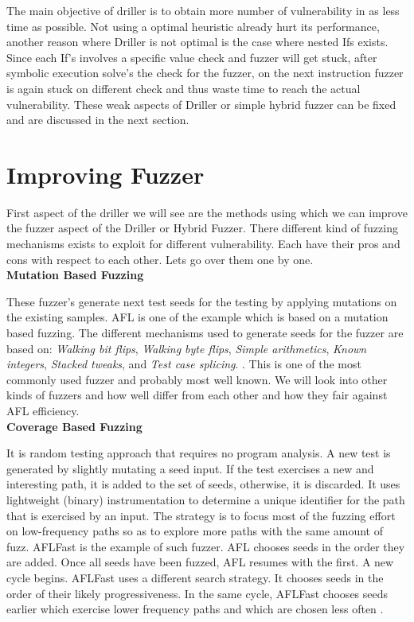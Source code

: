 \documentclass[a4paper, 11pt]{article}
\begin{document}
The main objective of driller is to obtain more number of vulnerability in as less time as possible. Not using a optimal heuristic already hurt its performance, another reason where Driller is not optimal is the case where nested Ifs exists. Since each If's involves a specific value check and fuzzer will get stuck, after symbolic execution solve's the check for the fuzzer, on the next instruction fuzzer is again stuck on different check and thus waste time to reach the actual vulnerability. These weak aspects of Driller or simple hybrid fuzzer can be fixed and are discussed in the next section. 
\section*{Improving Fuzzer}

First aspect of the driller we will see are the methods using which we can improve the fuzzer aspect of the Driller or Hybrid Fuzzer. There different kind of fuzzing mechanisms exists to exploit for different vulnerability. Each have their pros and cons with respect to each other. Lets go over them one by one.\\

\noindent
\textbf{Mutation Based Fuzzing}

These fuzzer's generate next test seeds for the testing by applying mutations on the existing samples. AFL is one of the example which is based on a mutation based fuzzing. The different mechanisms used to generate seeds for the fuzzer are based on: \emph{Walking bit flips}, \emph{Walking byte flips}, \emph{Simple arithmetics}, \emph{Known integers}, \emph{Stacked tweaks}, and \emph{Test case splicing}. \cite{googleguy}. This is one of the most commonly used fuzzer and probably most well known. We will look into other kinds of fuzzers and how well differ from each other and how they fair against AFL efficiency.\\

\noindent
\textbf{Coverage Based Fuzzing}

It is random testing approach that requires no program analysis. A new test is generated by slightly mutating a seed input. If the test
exercises a new and interesting path, it is added to the set of seeds, otherwise, it is discarded. It uses lightweight (binary) instrumentation to determine a unique identifier for the path that is exercised by an input. The strategy is to focus most of the fuzzing effort on low-frequency paths so as to explore more paths with the same amount of fuzz. AFLFast is the example of such fuzzer. AFL chooses seeds in the order they are added. Once all seeds have been fuzzed, AFL resumes with the first. A new cycle begins. AFLFast uses a different search strategy. It chooses seeds in the order of their likely progressiveness. In the same cycle, AFLFast chooses seeds earlier which exercise lower frequency paths and which are chosen less often \cite{aflfast}. 
\end{document}
